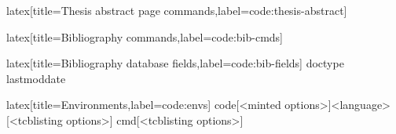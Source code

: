 %
\begin{code}[firstnumber=last]{latex}[title={Thesis abstract page commands},label=code:thesis-abstract]
\makethesisabstract
\end{code}
%
\begin{code}[firstnumber=last]{latex}[title={Bibliography commands},label=code:bib-cmds]
\makebibliography[<options>]
\end{code}
%
\begin{code}[firstnumber=last]{latex}[title={Bibliography database fields},label=code:bib-fields]
doctype
lastmoddate
\end{code}
%
\begin{code}[firstnumber=last]{latex}[title={Environments},label=code:envs]
{code}[<minted options>]{<language>}[<tcblisting options>]
{cmd}[<tcblisting options>]
\end{code}

